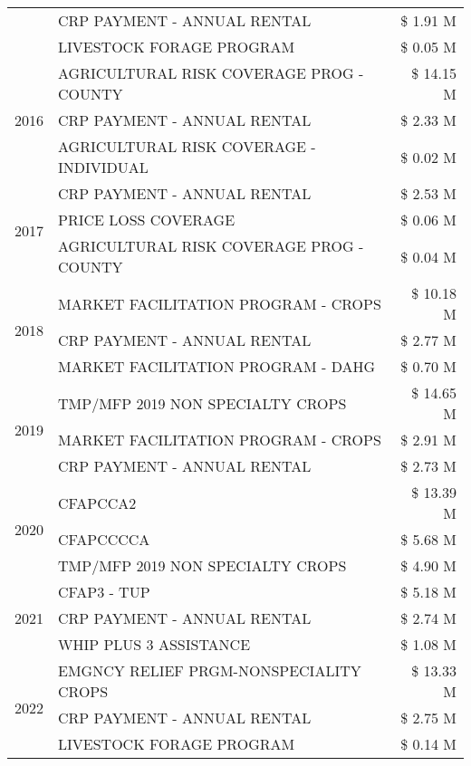 \begin{tabular}{llr}
 & CRP PAYMENT - ANNUAL RENTAL & \$ 1.91 M \\
 & LIVESTOCK FORAGE PROGRAM & \$ 0.05 M \\
\cline{1-3}
\multirow[t]{3}{*}{2016} & AGRICULTURAL RISK COVERAGE PROG - COUNTY & \$ 14.15 M \\
 & CRP PAYMENT - ANNUAL RENTAL & \$ 2.33 M \\
 & AGRICULTURAL RISK COVERAGE - INDIVIDUAL & \$ 0.02 M \\
\cline{1-3}
\multirow[t]{3}{*}{2017} & CRP PAYMENT - ANNUAL RENTAL & \$ 2.53 M \\
 & PRICE LOSS COVERAGE & \$ 0.06 M \\
 & AGRICULTURAL RISK COVERAGE PROG - COUNTY & \$ 0.04 M \\
\cline{1-3}
\multirow[t]{3}{*}{2018} & MARKET FACILITATION PROGRAM - CROPS & \$ 10.18 M \\
 & CRP PAYMENT - ANNUAL RENTAL & \$ 2.77 M \\
 & MARKET FACILITATION PROGRAM - DAHG & \$ 0.70 M \\
\cline{1-3}
\multirow[t]{3}{*}{2019} & TMP/MFP 2019 NON SPECIALTY CROPS & \$ 14.65 M \\
 & MARKET FACILITATION PROGRAM - CROPS & \$ 2.91 M \\
 & CRP PAYMENT - ANNUAL RENTAL & \$ 2.73 M \\
\cline{1-3}
\multirow[t]{3}{*}{2020} & CFAPCCA2 & \$ 13.39 M \\
 & CFAPCCCCA & \$ 5.68 M \\
 & TMP/MFP 2019 NON SPECIALTY CROPS & \$ 4.90 M \\
\cline{1-3}
\multirow[t]{3}{*}{2021} & CFAP3 - TUP & \$ 5.18 M \\
 & CRP PAYMENT - ANNUAL RENTAL & \$ 2.74 M \\
 & WHIP PLUS 3 ASSISTANCE & \$ 1.08 M \\
\cline{1-3}
\multirow[t]{3}{*}{2022} & EMGNCY RELIEF PRGM-NONSPECIALITY CROPS & \$ 13.33 M \\
 & CRP PAYMENT - ANNUAL RENTAL & \$ 2.75 M \\
 & LIVESTOCK FORAGE PROGRAM & \$ 0.14 M \\
\cline{1-3}
\bottomrule
\end{tabular}
